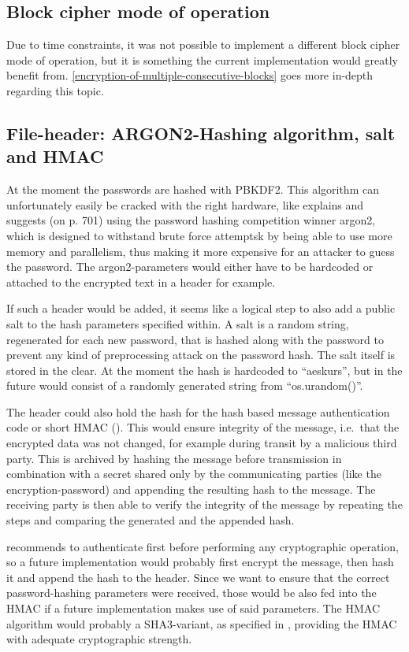 \hypertarget{block-cipher-mode-of-operation}{%
\subsection{Block cipher mode of
operation}\label{block-cipher-mode-of-operation}}

Due to time constraints, it was not possible to implement a different
block cipher mode of operation, but it is something the current
implementation would greatly benefit from. \ref{encryption-of-multiple-consecutive-blocks} goes more
in-depth regarding this topic.

\hypertarget{file-header-argon2-hashing-algorithm-salt-and-hmac}{%
\subsection{File-header: ARGON2-Hashing algorithm, salt and
HMAC}\label{file-header-argon2-hashing-algorithm-salt-and-hmac}}

At the moment the passwords are hashed with PBKDF2. This algorithm can
unfortunately easily be cracked with the right hardware, like \cite[p. 697]{appcrypt} explains and suggests (on p. 701) using the password hashing
competition winner argon2, which is designed to withstand brute force
attemptsk by being able to use more memory and parallelism, thus making it
more expensive for an attacker to guess the password. The
argon2-parameters would either have to be hardcoded or attached to the
encrypted text in a header for example.

If such a header would be added, it seems like a logical step to also
add a public salt to the hash parameters specified within. A salt is a
random string, regenerated for each new password, that is hashed along
with the password to prevent any kind of preprocessing attack on the
password hash. The salt itself is stored in the clear. \cite[p. 693]{appcrypt} At
the moment the hash is hardcoded to ``aeskurs'', but in the future would
consist of a randomly generated string from ``os.urandom()''.

The header could also hold the hash for the hash based message
authentication code or short HMAC (\cite[ch. 12.2.3]{paar}). This would ensure
integrity of the message, i.e.~that the encrypted data was not changed,
for example during transit by a malicious third party. This is archived
by hashing the message before transmission in combination with a secret
shared only by the communicating parties (like the encryption-password)
and appending the resulting hash to the message. The receiving party is
then able to verify the integrity of the message by repeating the steps
and comparing the generated and the appended hash.

\cite{moxie} recommends to authenticate first before performing any
cryptographic operation, so a future implementation would probably first
encrypt the message, then hash it and append the hash to the header.
Since we want to ensure that the correct password-hashing parameters
were received, those would be also fed into the HMAC if a future
implementation makes use of said parameters. The HMAC algorithm would
probably a SHA3-variant, as specified in \cite{fips202}, providing the HMAC
with adequate cryptographic strength.
